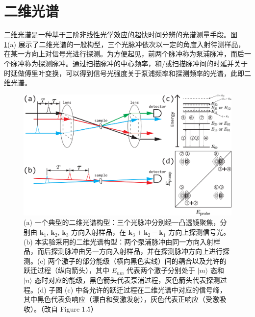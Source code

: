 \documentclass{thesis}
\begin{document}
\section{二维光谱}
二维光谱是一种基于三阶非线性光学效应的超快时间分辨的光谱测量手段。图 \ref{2D Spectrum Intro}(a) 展示了二维光谱的一般构型，三个光脉冲依次以一定的角度入射待测样品，在某一方向上对信号光进行探测。为方便起见，前两个脉冲称为泵浦脉冲，而后一个脉冲称为探测脉冲。通过扫描脉冲的中心频率，和/或扫描脉冲间的时延并关于时延做傅里叶变换，可以得到信号光强度关于泵浦频率和探测频率的光谱，此即二维光谱。

\begin{figure}[h]
    \centering
    \includegraphics[width=.8\columnwidth]{Img/2D Spectrum Intro.pdf}
    \caption{(a) 一个典型的二维光谱构型：三个光脉冲分别经一凸透镜聚焦，分别由 $\bm{k}_1$, $\bm{k}_2$, $\bm{k}_3$ 方向入射样品，在 $\bm{k}_3+\bm{k}_2-\bm{k}_1$ 方向上探测信号光。(b) 本实验采用的二维光谱构型：两个泵浦脉冲由同一方向入射样品，而后探测脉冲由另一方向入射样品，并在探测脉冲方向上进行探测。(c) 两个激子的部分能级（横向黑色实线）间的耦合以及允许的跃迁过程（纵向箭头），其中 $E_{nm}$ 代表两个激子分别处于 $\lvert m\rangle$ 态和 $\lvert n\rangle$ 态时对应的能级，黑色箭头代表泵浦过程，灰色箭头代表探测过程。(d) 子图 (c) 中各允许的跃迁过程在二维光谱中对应的信号峰，其中黑色代表负响应（漂白和受激发射），灰色代表正响应（受激吸收）。（改自 \cite{hamm2011concepts} Figure 1.5）}
    \label{2D Spectrum Intro}
\end{figure}
\end{document}
